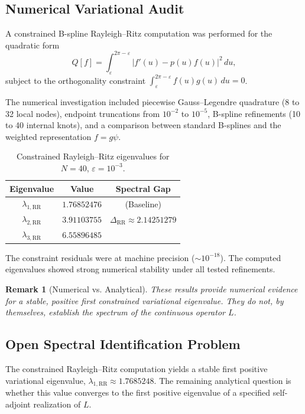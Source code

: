 \documentclass[12pt,a4paper]{article}
\newtheorem{remark}{Remark}
\begin{document}
\subsection{Numerical Variational Audit}
A constrained B-spline Rayleigh--Ritz computation was performed for the quadratic form
\[
Q[f]=\int_{\varepsilon}^{2\pi-\varepsilon} |f'(u)-p(u)f(u)|^2\,du,
\]
subject to the orthogonality constraint \(\int_{\varepsilon}^{2\pi-\varepsilon} f(u)g(u)\,du=0\).

The numerical investigation included piecewise Gauss--Legendre quadrature (8 to 32 local nodes), endpoint truncations from \(10^{-2}\) to \(10^{-5}\), B-spline refinements (10 to 40 internal knots), and a comparison between standard B-splines and the weighted representation \(f=g\psi\).

\begin{table}[h!]
\centering
\caption{Constrained Rayleigh--Ritz eigenvalues for $N=40$, $\varepsilon=10^{-3}$.}
\begin{tabular}{ccc}
\toprule
Eigenvalue & Value & Spectral Gap \\
\midrule
\(\lambda_{1,\mathrm{RR}}\) & \(1.76852476\) & (Baseline) \\
\(\lambda_{2,\mathrm{RR}}\) & \(3.91103755\) & \(\Delta_{\mathrm{RR}} \approx 2.14251279\) \\
\(\lambda_{3,\mathrm{RR}}\) & \(6.55896485\) & \\
\bottomrule
\end{tabular}
\end{table}

The constraint residuals were at machine precision (\(\sim 10^{-18}\)). The computed eigenvalues showed strong numerical stability under all tested refinements.

\begin{remark}[Numerical vs. Analytical]
These results provide numerical evidence for a stable, positive first constrained variational eigenvalue. They do not, by themselves, establish the spectrum of the continuous operator \(L\).
\end{remark}

\subsection{Open Spectral Identification Problem}\label{sec:open}

The constrained Rayleigh--Ritz computation yields a stable first positive variational eigenvalue, \(\lambda_{1,\mathrm{RR}}\approx1.7685248\). The remaining analytical question is whether this value converges to the first positive eigenvalue of a specified self-adjoint realization of \(L\).
\end{document}
